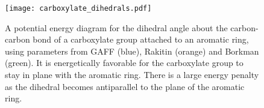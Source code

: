   \begin{figure}[!htb]
  \centering
  \texttt{[image: carboxylate\_dihedrals.pdf]}
  \caption{A potential energy diagram for the dihedral angle about the carbon-carbon bond of
  a carboxylate group attached to an aromatic ring, using parameters from GAFF (blue), 
  Rakitin (orange) and Borkman (green). It is energetically favorable for the 
  carboxylate group to stay in plane with the aromatic ring. There is a large energy 
  penalty as the dihedral becomes antiparallel to the plane of the aromatic 
  ring.}\label{S-fig:carboxylate_dihedral_rb}
  \end{figure}

  \clearpage

